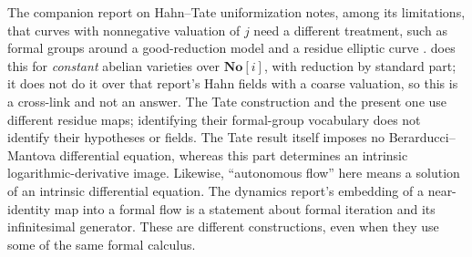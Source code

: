 \documentclass[11pt,letterpaper]{article}
\numberwithin{equation}{section}
\theoremstyle{definition}
\theoremstyle{remark}
\newcommand{\SC}{\mathbf{No}[i]}
\begin{document}
\begin{remark}
\label{diff:aut:rem:tate}
The companion report on Hahn--Tate uniformization notes, among its limitations,
that curves with nonnegative valuation of $j$ need a different treatment, such as
formal groups around a good-reduction model and a residue elliptic curve
\cite{RepoTate}.  does this for \emph{constant}
abelian varieties over $\SC$, with reduction by standard part; it does not do it
over that report's Hahn fields with a coarse valuation, so this is a cross-link
and not an answer. The Tate construction and the present one use
different residue maps; identifying their formal-group vocabulary
does not identify their hypotheses or fields. The Tate result
itself imposes no Berarducci--Mantova differential equation, whereas
this part determines an intrinsic logarithmic-derivative image.
Likewise, ``autonomous flow'' here means a solution of an intrinsic
differential equation. The dynamics report's embedding of a
near-identity map into a formal flow is a statement about formal
iteration and its infinitesimal generator. These are different
constructions, even when they use some of the same formal calculus.
\end{remark}
\end{document}
